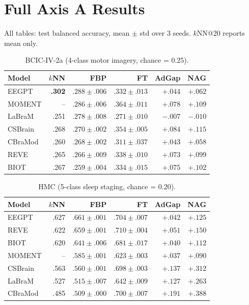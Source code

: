 \documentclass{article}
\begin{document}
\FloatBarrier
\section{Full Axis A Results}
\label{app:axis_a_full}

All tables: test balanced accuracy, mean $\pm$ std over 3 seeds. $k$NN@20 reports mean only.

\begin{table}[h]
  \caption{BCIC-IV-2a (4-class motor imagery, chance = 0.25).}
  \centering\small
  \begin{tabular}{lrrrrr}
    \toprule
    Model & $k$NN & FBP & FT & AdGap & NAG \\
    \midrule
    EEGPT & \textbf{.302} & $.288 \pm .006$ & $.332 \pm .013$ & $+.044$ & $+.062$ \\
    MOMENT & -- & $.286 \pm .006$ & $.364 \pm .011$ & $+.078$ & $+.109$ \\
    LaBraM & .251 & $.278 \pm .008$ & $.271 \pm .010$ & $-.007$ & $-.010$ \\
    CSBrain & .268 & $.270 \pm .002$ & $.354 \pm .005$ & $+.084$ & $+.115$ \\
    CBraMod & .260 & $.268 \pm .002$ & $.311 \pm .037$ & $+.043$ & $+.058$ \\
    REVE & .265 & $.266 \pm .009$ & $.338 \pm .010$ & $+.073$ & $+.099$ \\
    BIOT & .267 & $.259 \pm .004$ & $.334 \pm .015$ & $+.075$ & $+.102$ \\
    \bottomrule
  \end{tabular}
\end{table}

\begin{table}[h]
  \caption{HMC (5-class sleep staging, chance = 0.20).}
  \centering\small
  \begin{tabular}{lrrrrr}
    \toprule
    Model & $k$NN & FBP & FT & AdGap & NAG \\
    \midrule
    EEGPT & .627 & $.661 \pm .001$ & $.704 \pm .007$ & $+.042$ & $+.125$ \\
    REVE & .622 & $.659 \pm .001$ & $.710 \pm .004$ & $+.051$ & $+.150$ \\
    BIOT & .620 & $.641 \pm .006$ & $.681 \pm .017$ & $+.040$ & $+.112$ \\
    MOMENT & -- & $.585 \pm .001$ & $.623 \pm .003$ & $+.037$ & $+.090$ \\
    CSBrain & .563 & $.560 \pm .001$ & $.698 \pm .003$ & $+.137$ & $+.312$ \\
    LaBraM & .527 & $.515 \pm .007$ & $.642 \pm .009$ & $+.127$ & $+.263$ \\
    CBraMod & .485 & $.509 \pm .000$ & $.700 \pm .007$ & $+.191$ & $+.388$ \\
    \bottomrule
  \end{tabular}
\end{table}
\end{document}

